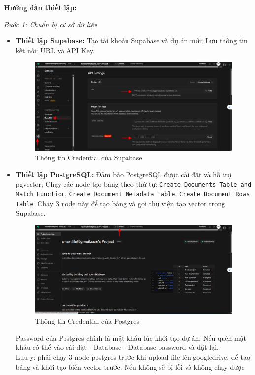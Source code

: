 \textbf{Hướng dẫn thiết lập:}

\textit{Bước 1: Chuẩn bị cơ sở dữ liệu}
\begin{itemize}
    \item \textbf{Thiết lập Supabase:} Tạo tài khoản Supabase và dự án mới; Lưu thông tin kết nối: URL và API Key.
    \begin{figure}[H]
    \centering
    \includegraphics[width=1\textwidth]{images/1rag05.pdf}
    \caption{Thông tin Credential của Supabase}
    \end{figure}
    
    \item \textbf{Thiết lập PostgreSQL:} Đảm bảo PostgreSQL được cài đặt và hỗ trợ pgvector; Chạy các node tạo bảng theo thứ tự: \texttt{Create Documents Table and Match Function}, \texttt{Create Document Metadata Table}, \texttt{Create Document Rows Table}. Chạy 3 node này để tạo bảng và gọi thư viện tạo vector trong Supabase.\\
    \begin{figure}[H]
\centering
\includegraphics[width=1\textwidth]{images/1rag06.pdf}
\caption{Thông tin Credential của Postgres}
\end{figure}
Password của Postgres chính là mật khẩu lúc khởi tạo dự án. Nếu quên mật khẩu có thể vào cài đặt - Database - Database password và đặt lại. \\

Luu ý: phải chạy 3 node postgres trước khi upload file lên googledrive, để tạo bảng và khởi tạo biến vector trước. Nếu không sẽ bị lỗi và không chạy được\\

\end{itemize}
    


